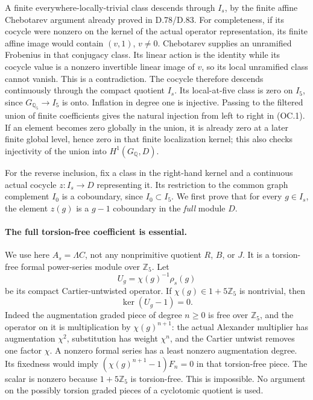 A finite everywhere-locally-trivial class descends through
\(I_s\), by the finite affine Chebotarev argument already
proved in D.78/D.83. For completeness, if its cocycle were
nonzero on the kernel of the actual operator representation,
its finite affine image would contain \((v,1)\), \(v\ne0\).
Chebotarev supplies an unramified Frobenius in that conjugacy
class. Its linear action is the identity while its cocycle
value is a nonzero invertible linear image of \(v\), so its
local unramified class cannot vanish. This is a contradiction.
The cocycle therefore descends continuously through the compact
quotient \(I_s\). Its local-at-five class is zero on \(I_5\),
since \(G_{\mathbb Q_5}\to I_5\) is onto.
Inflation in degree one is injective. Passing to the filtered
union of finite coefficients gives the natural injection from
left to right in (OC.1). If an element becomes zero globally
in the union, it is already zero at a later finite global
level, hence zero in that finite localization kernel; this
also checks injectivity of the union into \(H^1(G_{\mathbb Q},D)\).

For the reverse inclusion, fix a class in the right-hand kernel
and a continuous actual cocycle \(z:I_s\to D\) representing
it. Its restriction to the common graph complement \(I_0\)
is a coboundary, since \(I_0\subset I_5\). We first prove
that for every \(g\in I_s\), the element \(z(g)\) is a
\(g-1\) coboundary in the \emph{full} module \(D\).

\paragraph{The full torsion-free coefficient is essential.}
We use here \(A_s=\Lambda C\), not any nonprimitive quotient
\(R\), \(B\), or \(J\). It is a torsion-free formal power-series
module over \(\mathbb Z_5\). Let
\[
                     U_g=\chi(g)^{-1}\rho_s(g)
\]
be its compact Cartier-untwisted operator. If
\(\chi(g)\in1+5\mathbb Z_5\) is nontrivial, then
\[
                         \ker(U_g-1)=0.               \tag{OC.6}
\]
Indeed the augmentation graded piece of degree \(n\ge0\)
is free over \(\mathbb Z_5\), and the operator on it is
multiplication by \(\chi(g)^{n+1}\): the actual Alexander
multiplier has augmentation \(\chi^2\), substitution has
weight \(\chi^n\), and the Cartier untwist removes one
factor \(\chi\). A nonzero formal series has a least
nonzero augmentation degree. Its fixedness would imply
\((\chi(g)^{n+1}-1)F_n=0\) in that torsion-free piece.
The scalar is nonzero because \(1+5\mathbb Z_5\) is
torsion-free. This is impossible. No argument on the possibly
torsion graded pieces of a cyclotomic quotient is used.

